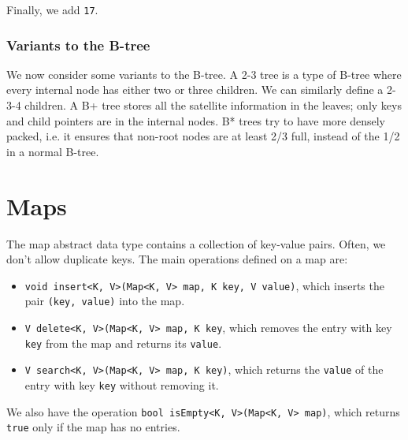\documentclass[a4paper, openany]{memoir}
\begin{document}
Finally, we add \texttt{17}.
\begin{center}
\end{center}

\subsubsection{Variants to the B-tree}
We now consider some variants to the B-tree. A 2-3 tree is a type of B-tree where every internal node has either two or three children. We can similarly define a 2-3-4 children. A B+ tree stores all the satellite information in the leaves; only keys and child pointers are in the internal nodes. B* trees try to have more densely packed, i.e. it ensures that non-root nodes are at least 2/3 full, instead of the 1/2 in a normal B-tree.
\newpage

\section{Maps}
The map abstract data type contains a collection of key-value pairs. Often, we don't allow duplicate keys. The main operations defined on a map are:
\begin{itemize}
    \item \texttt{void insert<K, V>(Map<K, V> map, K key, V value)}, which inserts \newline the pair \texttt{(key, value)} into the map.
    \item \texttt{V delete<K, V>(Map<K, V> map, K key}, which removes the entry with key \texttt{key} from the map and returns its \texttt{value}.
    \item \texttt{V search<K, V>(Map<K, V> map, K key)}, which returns the \texttt{value} of the entry with key \texttt{key} without removing it.
\end{itemize}
We also have the operation \texttt{bool isEmpty<K, V>(Map<K, V> map)}, which returns \texttt{true} only if the map has no entries.
\end{document}
